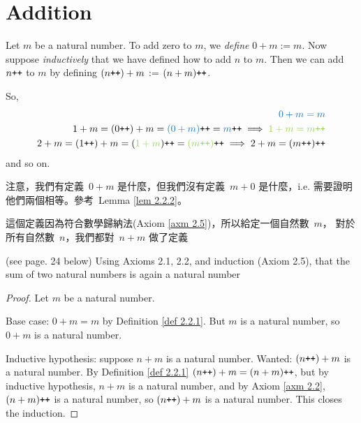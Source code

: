 \section{Addition}\label{sec 2.2}

\newcommand{\BLUE}[1]{\textcolor{RoyalBlue}{#1}}
\newcommand{\GREEN}[1]{\textcolor{YellowGreen}{#1}}
\newcommand{\MAROON}[1]{\textcolor{Maroon}{#1}}
\newcommand{\RED}[1]{\textcolor{Red}{#1}}

\begin{definition}  \label{def 2.2.1} Let \(m\) be a natural number. To add zero to \(m\), we \emph{define} \(0 + m := m\). Now suppose \emph{inductively} that we have defined how to add \(n\) to \(m\). Then we can add \(n\texttt{++} \) to \(m\) by defining \((n\texttt{++}) + m\) := \((n + m)\texttt{++}\).
\end{definition}
\begin{note}
So,
\begin{align*}
\BLUE{0 + m = m}\\
1 + m = (0\INC) + m = \BLUE{(0 + m)}\INC = \BLUE{m}\INC \implies \GREEN{1 + m = m\INC} \\
2 + m = (1\INC) + m = (\GREEN{1 + m})\INC = \GREEN{(m\INC)}\INC \implies 2 + m = (m\INC)\INC
\end{align*}
and so on.
\end{note}
\begin{note}
注意，我們有定義\ \(0 + m\) 是什麼，但我們沒有定義\ \(m + 0\) 是什麼，i.e. 需要證明他們兩個相等。參考\ Lemma \ref{lem 2.2.2}。
\end{note}
\begin{note}
這個定義因為符合數學歸納法(Axiom \ref{axm 2.5})，所以給定一個自然數\ \(m\)， 對於所有自然數\ \(n\)，我們都對\ \(n + m\) 做了定義
\end{note}

\begin{additional corollary}\label{ac 2.2.1} (see page. 24 below) Using Axioms 2.1, 2.2, and induction (Axiom 2.5), that the sum of two natural numbers is again a natural number 
\end{additional corollary}
\begin{proof}
Let \(m\) be a natural number.

Base case: \(0 + m = m\) by Definition \ref{def 2.2.1}. But \(m\) is a natural number, so \(0 + m\) is a natural number. 

Inductive hypothesis: suppose \(n + m\) is a natural number. Wanted: \((n\texttt{++}) + m\) is a natural number. By Definition \ref{def 2.2.1} \BLUE{\((n\texttt{++}) + m = (n + m)\texttt{++}\)}, but by inductive hypothesis, \(n + m\) is a natural number, and by Axiom \ref{axm 2.2}, \BLUE{\((n + m)\texttt{++}\)} is a natural number, so \BLUE{\((n\texttt{++}) + m\)} is a natural number. This closes the induction.
\end{proof}

